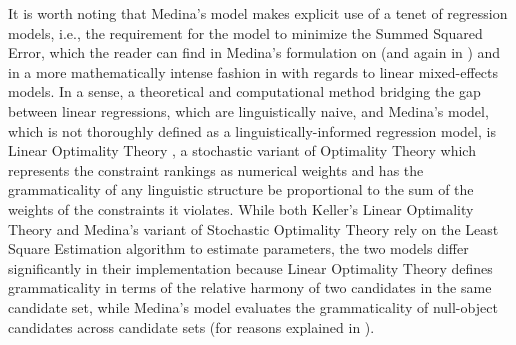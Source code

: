 It is worth noting that Medina's model makes explicit use of a tenet of regression models, i.e., the requirement for the model to minimize the Summed Squared Error, which the reader can find in Medina's formulation on  (and again in ) and in a more mathematically intense fashion in \textcite[13]{r_lmer} with regards to linear mixed-effects models. In a sense, a theoretical and computational method bridging the gap between linear regressions, which are linguistically naive, and Medina's model, which is not thoroughly defined as a linguistically-informed regression model, is Linear Optimality Theory \parencite{Keller2000, Keller2006}, a stochastic variant of Optimality Theory which represents the constraint rankings as numerical weights and has the grammaticality of any linguistic structure be proportional to the sum of the weights of the constraints it violates. While both Keller's Linear Optimality Theory and Medina's variant of Stochastic Optimality Theory rely on the Least Square Estimation algorithm to estimate parameters, the two models differ significantly in their implementation because Linear Optimality Theory defines grammaticality in terms of the relative harmony of two candidates in the same candidate set, while Medina's model evaluates the grammaticality of null-object candidates across candidate sets (for reasons explained in ).
